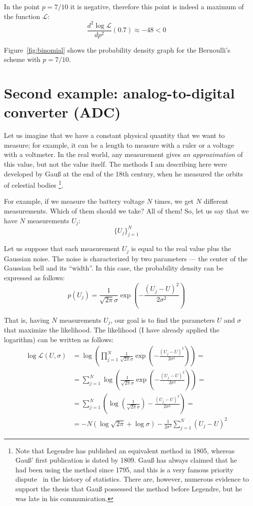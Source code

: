 \documentclass[notitlepage,oneside]{book}
\begin{document}
In the point $p=7/10$ it is negative, therefore this point is indeed a maximum of the function $\mathcal{L}$:
$$\frac{d^2 \log \mathcal{L}}{dp^2}(0.7)  \approx -48 < 0$$

Figure~\ref{fig:binomial} shows the probability density graph for the Bernoulli's scheme with $p=7/10$.


\section{Second example: analog-to-digital converter (ADC)}

Let us imagine that we have a constant physical quantity that we want to measure; for example, it can be a length to measure with a ruler or a voltage with a voltmeter.
In the real world, any measurement gives \textit{an approximation} of this value, but not the value itself.
The methods I am describing here were developed by Gauß at the end of the 18th century, when he measured the orbits of celestial bodies
\footnote{Note that Legendre has published an equivalent method in 1805, 
whereas Gauß' first publication is dated by 1809. Gauß has always claimed that he had been using the method since 1795,
and this is a very famous priority dispute~\cite{stigler1981} in the history of statistics.
There are, however, numerous evidence to support the thesis that Gauß possessed the method before Legendre, but he was late in his communication.}.
~\cite{gauss1809theoria}

For example, if we measure the battery voltage $N$ times, we get $N$ different measurements. Which of them should we take? All of them! 
So, let us say that we have $N$ measurements $U_j$:
$$
\{U_j\}_{j=1}^{N}
$$

Let us suppose that each measurement $U_j$ is equal to the real value plus the Gaussian noise. 
The noise is characterized by two parameters --- the center of the Gaussian bell and its ``width''. 
In this case, the probability density can be expressed as follows:
$$
p(U_j) = \frac{1}{\sqrt{2\pi}\sigma} \exp\left(-\frac{(U_j-U)^2}{2\sigma^2}\right)
$$

That is, having $N$ measurements $U_j$, our goal is to find the parameters $U$ and $\sigma$ that maximize the likelihood.
The likelihood (I have already applied the logarithm) can be written as follows:
\begin{align*}
\log \mathcal{L}(U,\sigma) & = \log \left(\prod\limits_{j=1}^N  \frac{1}{\sqrt{2\pi}\sigma} \exp\left(-\frac{(U_j-U)^2}{2\sigma^2}\right)\right) =\\
& = \sum\limits_{j=1}^N \log \left(\frac{1}{\sqrt{2\pi}\sigma} \exp\left(-\frac{(U_j-U)^2}{2\sigma^2}\right)\right) = \\
& = \sum\limits_{j=1}^N \left(\log \left(\frac{1}{\sqrt{2\pi}\sigma}\right) -\frac{(U_j-U)^2}{2\sigma^2}\right) = \\
& = -N \left(\log\sqrt{2\pi} + \log\sigma\right) - \frac{1}{2\sigma^2} \sum\limits_{j=1}^N (U_j-U)^2
\end{align*}
\end{document}
